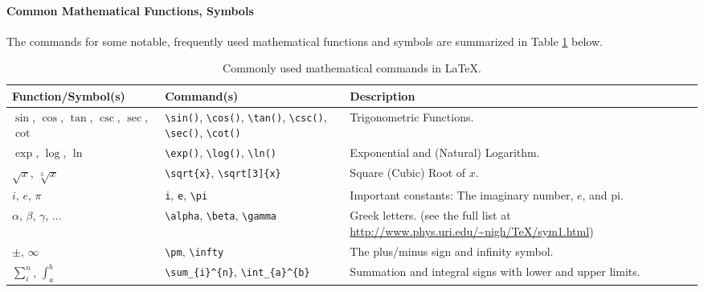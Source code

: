 \paragraph{Common Mathematical Functions, Symbols}
The commands for some notable, frequently used mathematical functions and symbols are summarized in Table \ref{tab:functions} below.
\begin{table}[ht!]
\begin{tabularx}{\textwidth}{|p{}|>{\raggedright}p{}|X|}
\hline
Function/Symbol(s) & Command(s) & Description \\
\hline
$\sin$, $\cos$, $\tan$, $\csc$, $\sec$, $\cot$ & \texttt{\textbackslash sin()}, \texttt{\textbackslash cos()}, \texttt{\textbackslash tan()}, \texttt{\textbackslash csc()}, \texttt{\textbackslash sec()}, \texttt{\textbackslash cot()} & Trigonometric Functions. \\
\hline
$\exp$, $\log$, $\ln$ & \texttt{\textbackslash exp()}, \texttt{\textbackslash log()}, \texttt{\textbackslash ln()} & Exponential and (Natural) Logarithm. \\
\hline
$\sqrt{x}$, $\sqrt[3]{x}$ & \texttt{\textbackslash sqrt\{x\}}, \texttt{\textbackslash sqrt[3]\{x\}} & Square (Cubic) Root of $x$. \\
\hline
$i$, $e$, $\pi$ & \texttt{i}, \texttt{e}, \texttt{\textbackslash pi} & Important constants: The imaginary number, $e$, and pi. \\
\hline
$\alpha$, $\beta$, $\gamma$, $\ldots$ & \texttt{\textbackslash alpha}, \texttt{\textbackslash beta}, \texttt{\textbackslash gamma} & Greek letters. (see the full list at \href{http://www.phys.uri.edu/~nigh/TeX/sym1.html}{http://www.phys.uri.edu/\~{}nigh/\allowbreak TeX/sym1.html}) \\
\hline
$\pm$, $\infty$ & \texttt{\textbackslash pm}, \texttt{\textbackslash infty} & The plus/minus sign and infinity symbol. \\
\hline
$\sum_i^n$, $\int_a^b$ & \texttt{\textbackslash sum\_\{i\}\^{}\{n\}}, \texttt{\textbackslash int\_\{a\}\^{}\{b\}} & Summation and integral signs with lower and upper limits. \\
\hline
\end{tabularx}
\caption{Commonly used mathematical commands in \LaTeX{}.}
\label{tab:functions}
\end{table}

